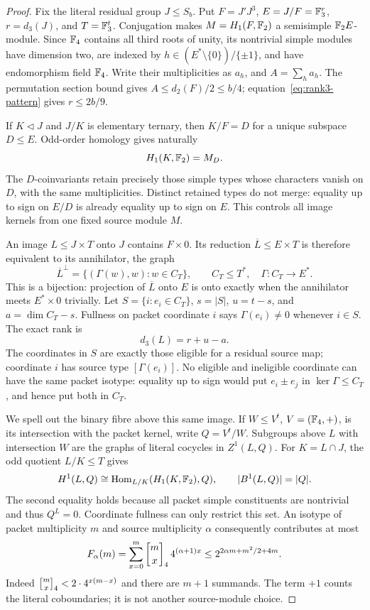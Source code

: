 \begin{proof}
Fix the literal residual group $J\leq S_b$. Put
$F=J'J^3$, $E=J/F=\mathbb F_3^r$, $r=d_3(J)$, and
$T=\mathbb F_3^t$. Conjugation makes $M=H_1(F,\mathbb F_2)$ a
semisimple $\mathbb F_2E$-module. Since $\mathbb F_4$ contains all third
roots of unity, its nontrivial simple modules have dimension two,
are indexed by $h\in(E^*\setminus\{0\})/\{\pm1\}$,
and have endomorphism field $\mathbb F_4$. Write their multiplicities as
$a_h$, and $A=\sum_h a_h$. The permutation section bound gives
$A\leq d_2(F)/2\leq b/4$; equation~\eqref{eq:rank3-pattern} gives
$r\leq2b/9$.

If $K\lhd J$ and $J/K$ is elementary ternary, then $K/F=D$
for a unique subspace $D\leq E$. Odd-order homology gives naturally
\[
 H_1(K,\mathbb F_2)=M_D.
\]
The $D$-coinvariants retain precisely those simple types whose
characters vanish on $D$, with the same multiplicities. Distinct
retained types do not merge: equality up to sign on $E/D$ is already
equality up to sign on $E$. This controls all image kernels from one
fixed source module $M$.

An image $L\leq J\times T$ onto $J$ contains $F\times0$.
Its reduction $\overline L\leq E\times T$ is therefore equivalent
to its annihilator, the graph
\[
 \overline L^\perp=\{(\Gamma(w),w):w\in C_T\},
       \qquad C_T\leq T^*,\quad\Gamma:C_T\to E^*.
\]
This is a bijection: projection of $\overline L$ onto $E$ is onto
exactly when the annihilator meets $E^*\times0$ trivially.
Let $S=\{i:e_i\in C_T\}$, $s=|S|$, $u=t-s$,
and $a=\dim C_T-s$. Fullness on packet coordinate $i$ says
$\Gamma(e_i)\ne0$ whenever $i\in S$. The exact rank is
\[
 d_3(L)=r+u-a.
\]
The coordinates in $S$ are exactly those eligible for a residual
source map; coordinate $i$ has source type $[\Gamma(e_i)]$.
No eligible and ineligible coordinate can have the same packet
isotype: equality up to sign would put $e_i\pm e_j$ in
$\ker\Gamma\leq C_T$, and hence put both in $C_T$.

We spell out the binary fibre above this same image. If
$W\leq V^t$, $V=(\mathbb F_4,+)$, is its intersection with the packet
kernel, write $Q=V^t/W$. Subgroups above $L$ with intersection $W$
are the graphs of literal cocycles in $Z^1(L,Q)$. For
$K=L\cap J$, the odd quotient $L/K\leq T$ gives
\[
 H^1(L,Q)\cong\operatorname{Hom}_{L/K}(H_1(K,\mathbb F_2),Q),
       \qquad |B^1(L,Q)|=|Q|.
\]
The second equality holds because all packet simple constituents
are nontrivial and thus $Q^L=0$. Coordinate fullness can only
restrict this set. An isotype of packet multiplicity $m$ and source
multiplicity $\alpha$ consequently contributes at most
\[
 F_\alpha(m)=\sum_{x=0}^m\gauss mx4\,4^{(\alpha+1)x}
          \leq2^{2\alpha m+m^2/2+4m}.
\]
Indeed $\gauss mx4<2\cdot4^{x(m-x)}$ and there are $m+1$
summands. The term $+1$ counts the literal coboundaries; it is not
another source-module choice.


\end{proof}
